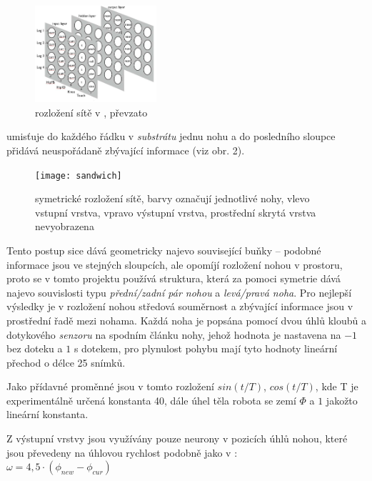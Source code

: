 \documentclass[a4]{article}
\begin{document}
\begin{figure}
  \begin{center}
    \includegraphics[width=0.4\textwidth]{clunenet}
  \end{center}
  \caption{rozložení sítě v \cite{clunegait}, převzato \cite{clunegait}}
\end{figure}

\cite{clunegait} umisťuje do každého řádku v \emph{substrátu} jednu nohu a do posledního sloupce přidává neuspořádaně zbývající informace (viz obr. 2).\par
\begin{figure}
  \begin{center}
    \texttt{[image: sandwich]}
  \end{center}
  \caption{symetrické rozložení sítě, barvy označují jednotlivé nohy, vlevo vstupní vrstva, vpravo výstupní vrstva, prostřední skrytá vrstva nevyobrazena}
\end{figure}
Tento postup sice dává geometricky najevo související buňky -- podobné informace jsou ve stejných sloupcích, ale opomíjí rozložení nohou v prostoru, proto se v tomto projektu používá struktura, která za pomoci symetrie dává najevo souvislosti typu \emph{přední/zadní pár nohou} a \emph{levá/pravá noha}. Pro nejlepší výsledky je v rozložení nohou středová souměrnost a zbývající informace jsou v prostřední řadě mezi nohama. Každá noha je popsána pomocí dvou úhlů kloubů a dotykového \emph{senzoru} na spodním článku nohy, jehož hodnota je nastavena na $-1$ bez doteku a $1$ s dotekem, pro plynulost pohybu mají tyto hodnoty lineární přechod o délce 25 snímků.\par
Jako přídavné proměnné jsou v tomto rozložení $sin(t/T)$, $cos(t/T)$, kde T je experimentálně určená konstanta 40, dále úhel těla robota se zemí $\Phi$ a $1$ jakožto lineární konstanta.\par
Z výstupní vrstvy jsou využívány pouze neurony v pozicích úhlů nohou, které jsou převedeny na úhlovou rychlost podobně jako v \cite{clunegait}:\\
$\omega = 4,5\cdot(\phi_{new} - \phi_{cur})$
\end{document}
